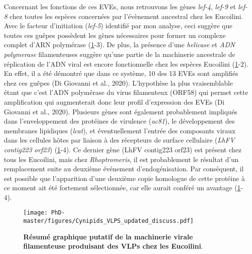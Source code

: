 Concernant les fonctions de ces EVEs, nous retrouvons les gènes \textit{lef-4}, \textit{lef-9} et \textit{lef-8} chez toutes les espèces concernées par l'évènement ancestral chez les Eucoilini. Avec le facteur d'initiation (\textit{lef-5}) identifié par mon analyse, ceci suggère que toutes ces guêpes possèdent les gènes nécessaires pour former un complexe complet d'ARN polymérase (\figurename{\ref{figure:Cynipids_VLPS_updated_discuss}}-3). De plus, la présence d'une \textit{helicase} et \textit{ADN polymerase} filamenteuses suggère qu'une partie de la machinerie ancestrale de réplication de l'ADN viral est encore fonctionnelle chez les espèces Eucoilini (\figurename{\ref{figure:Cynipids_VLPS_updated_discuss}}-2). En effet, il a été démontré que dans ce système, 10 des 13 EVEs sont amplifiés chez ces guêpes (Di Giovanni et al., 2020). L'hypothèse la plus vraisemblable étant que c'est l'ADN polymérase du virus filamenteux (ORF58) qui permet cette amplification qui augmenterait donc leur profil d'expression des EVEs (Di Giovanni et al., 2020). Plusieurs gènes sont également probablement impliqués dans l'enveloppement des protéines de virulence (\textit{ac81}), le développement des membranes lipidiques (\textit{lcat}), et éventuellement l'entrée des composants viraux dans les cellules hôtes par liaison à des récepteurs de surface cellulaire (\textit{LhFV contig223 orf23}) (\figurename{\ref{figure:Cynipids_VLPS_updated_discuss}}-4). Ce dernier gène (LhFV contig223 orf23) est présent chez tous les Eucoilini, mais chez \textit{Rhoptromeris}, il est probablement le résultat d'un remplacement suite au deuxième événement d'endogénisation. Par conséquent, il est possible que l'apparition d'une deuxième copie homologue de cette protéine à ce moment ait été fortement sélectionnée, car elle aurait conféré un avantage (\figurename{\ref{figure:Cynipids_VLPS_updated_discuss}}-4).\\

\begin{figure}[!htpbt]
\captionsetup{font=footnotesize}
 \centering
  \texttt{[image: PhD-master/figures/Cynipids\_VLPS\_updated\_discuss.pdf]}
\caption[Discuss:Résumé graphique putatif de la machinerie virale filamenteuse produisant des VLPs chez les Eucoilini]{\textbf{Résumé graphique putatif de la machinerie virale filamenteuse produisant des VLPs chez les Eucoilini}.}
\label{figure:Cynipids_VLPS_updated_discuss}
\end{figure}

